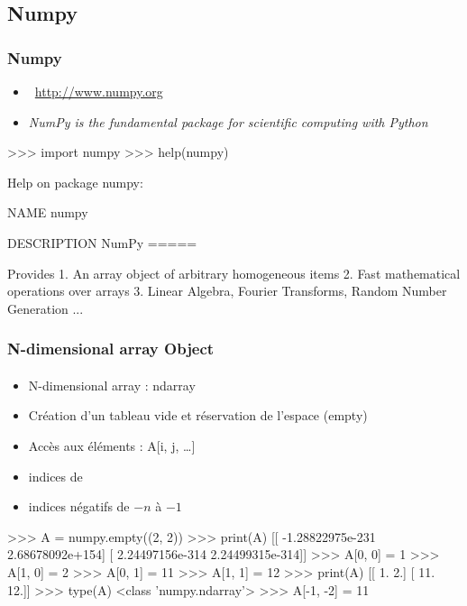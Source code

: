 \subsection{Numpy}
\begin{frame}[fragile]
\frametitle{Numpy}
\begin{itemize}
 \item {} \, \url{http://www.numpy.org}
 \item \emph{NumPy is the fundamental package for scientific computing with Python}
\end{itemize}
\begin{pythonConsole}
>>> import numpy
>>> help(numpy)

Help on package numpy:

NAME
    numpy

DESCRIPTION
    NumPy
    =====
    
    Provides
      1. An array object of arbitrary homogeneous items
      2. Fast mathematical operations over arrays
      3. Linear Algebra, Fourier Transforms, Random Number Generation
...
\end{pythonConsole}
\end{frame}
\begin{frame}[fragile]
\frametitle{N-dimensional array Object}
\framesubtitle{}
\begin{itemize}
 \item N-dimensional array : ndarray
 \item Création d'un tableau vide et réservation de l'espace (empty)
 \item Accès aux éléments : A[i, j, \dots] 
 \item indices de {\color{red}{0 à $n-1$}}
 \item indices négatifs de $-n$ à $-1$
\end{itemize}
\begin{pythonConsole}

>>> A = numpy.empty((2, 2))
>>> print(A)
[[ -1.28822975e-231   2.68678092e+154]
 [  2.24497156e-314   2.24499315e-314]]
>>> A[0, 0] = 1
>>> A[1, 0] = 2
>>> A[0, 1] = 11
>>> A[1, 1] = 12
>>> print(A)
[[  1.   2.]
 [ 11.  12.]]
>>> type(A)
<class 'numpy.ndarray'>
>>> A[-1, -2] = 11
\end{pythonConsole}
\end{frame}
